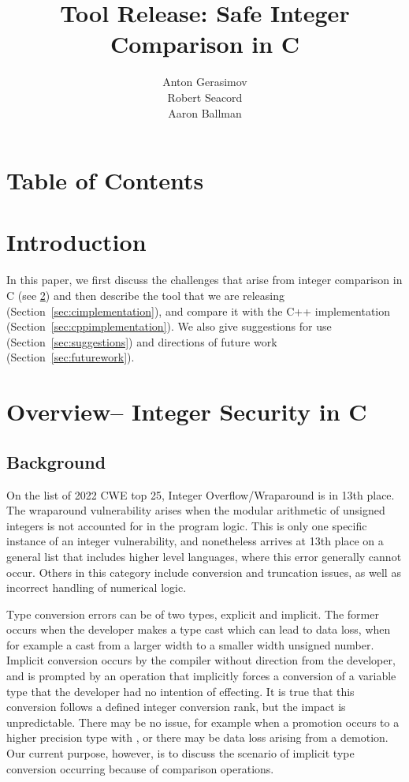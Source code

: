 \documentclass[11pt,letterpaper]{article}
\title{Tool Release: Safe Integer Comparison in C}
\author{Anton Gerasimov\\
Robert Seacord\\
Aaron Ballman}
\begin{document}
\maketitle
\newpage
\thispagestyle{fancy}
\clearpage
\section*{Table of Contents}
\makeatletter
\renewcommand\tableofcontents{\@starttoc{toc}} %
\makeatother
\bgroup%
\hypersetup{linkcolor=black}%
\tableofcontents
\egroup%
\thispagestyle{nccsection}
\pagebreak


\section{Introduction}

In this paper, we first discuss the challenges that arise from integer comparison in C (see
\ref{sec:overview}) and then describe the tool that we are releasing (Section~\ref{sec:cimplementation}), and compare it with the C++ implementation (Section~\ref{sec:cppimplementation}). We also give suggestions for use (Section~\ref{sec:suggestions}) and directions of future work (Section~\ref{sec:futurework}).



\section{Overview– Integer Security in C}
\label{sec:overview}

\subsection{Background }
\Blindtext[2]
On the list of 2022 CWE top 25, Integer Overflow/Wraparound is in 13th place. The wraparound vulnerability arises when the modular arithmetic of unsigned integers is not accounted for in the program logic. This is only one specific instance of an integer vulnerability, and nonetheless arrives at 13th place on a  general list that includes higher level languages, where this error generally cannot occur. Others in this category include conversion and truncation issues, as well as incorrect handling of numerical logic. 

Type conversion errors can be of two types, explicit and implicit. The former occurs when the developer makes a type cast which can lead to data loss, when for example a cast from a larger width to a smaller width unsigned number. Implicit conversion occurs by the compiler without direction from the developer, and is prompted by an operation that implicitly forces a conversion of a variable type that the developer had no intention of effecting. It is true that this conversion follows a defined integer conversion rank, but the impact is unpredictable. There may be no issue, for example when a promotion occurs to a higher precision type with , or there may be data loss arising from a demotion. Our current purpose, however, is to discuss the scenario of implicit type conversion occurring because of comparison operations.
\end{document}
